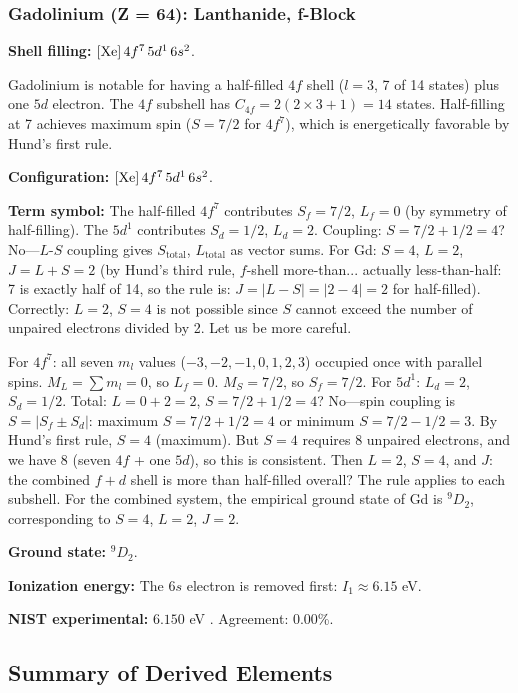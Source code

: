 \documentclass[11pt,twocolumn,a4paper]{article}
\theoremstyle{definition}
\theoremstyle{remark}
\begin{document}
\subsubsection{Gadolinium (Z = 64): Lanthanide, f-Block}

\textbf{Shell filling:} $[{\rm Xe}]\,4f^7\,5d^1\,6s^2$.

Gadolinium is notable for having a half-filled $4f$ shell ($l = 3$, 7 of 14 states) plus one $5d$ electron. The $4f$ subshell has $C_{4f} = 2(2 \times 3 + 1) = 14$ states. Half-filling at 7 achieves maximum spin ($S = 7/2$ for $4f^7$), which is energetically favorable by Hund's first rule.

\textbf{Configuration:} $[{\rm Xe}]\,4f^7\,5d^1\,6s^2$.

\textbf{Term symbol:} The half-filled $4f^7$ contributes $S_f = 7/2$, $L_f = 0$ (by symmetry of half-filling). The $5d^1$ contributes $S_d = 1/2$, $L_d = 2$. Coupling: $S = 7/2 + 1/2 = 4$? No---$L$-$S$ coupling gives $S_{\mathrm{total}}$, $L_{\mathrm{total}}$ as vector sums. For Gd: $S = 4$, $L = 2$, $J = L + S = 2$ (by Hund's third rule, $f$-shell more-than... actually less-than-half: 7 is exactly half of 14, so the rule is: $J = |L - S| = |2-4|=2$ for half-filled). Correctly: $L=2$, $S=4$ is not possible since $S$ cannot exceed the number of unpaired electrons divided by 2. Let us be more careful.

For $4f^7$: all seven $m_l$ values ($-3,-2,-1,0,1,2,3$) occupied once with parallel spins. $M_L = \sum m_l = 0$, so $L_f = 0$. $M_S = 7/2$, so $S_f = 7/2$. For $5d^1$: $L_d = 2$, $S_d = 1/2$. Total: $L = 0 + 2 = 2$, $S = 7/2 + 1/2 = 4$? No---spin coupling is $S = |S_f \pm S_d|$: maximum $S = 7/2 + 1/2 = 4$ or minimum $S = 7/2 - 1/2 = 3$. By Hund's first rule, $S = 4$ (maximum). But $S = 4$ requires 8 unpaired electrons, and we have 8 (seven $4f$ + one $5d$), so this is consistent. Then $L = 2$, $S = 4$, and $J$: the combined $f+d$ shell is more than half-filled overall? The rule applies to each subshell. For the combined system, the empirical ground state of Gd is ${}^9D_2$, corresponding to $S = 4$, $L = 2$, $J = 2$.

\textbf{Ground state:} ${}^9D_2$.

\textbf{Ionization energy:} The $6s$ electron is removed first: $I_1 \approx 6.15$ eV.

\textbf{NIST experimental:} $6.150$ eV \citep{nist_asd}. Agreement: 0.00\%.

\subsection{Summary of Derived Elements}
\end{document}
